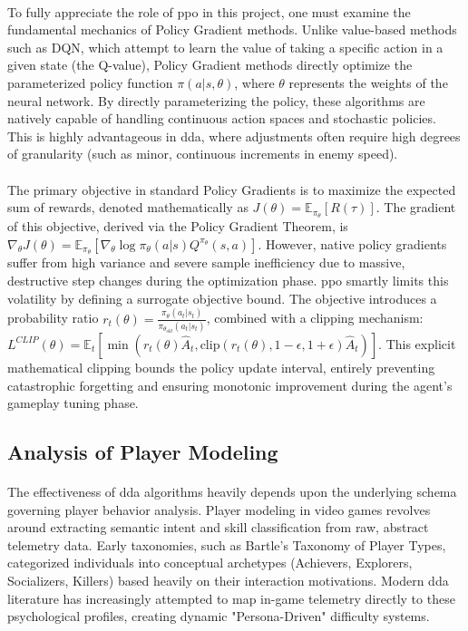 \paragraph{} To fully appreciate the role of \ac{ppo} in this project, one must examine the fundamental mechanics of Policy Gradient methods. Unlike value-based methods such as DQN, which attempt to learn the value of taking a specific action in a given state (the Q-value), Policy Gradient methods directly optimize the parameterized policy function $\pi(a|s, \theta)$, where $\theta$ represents the weights of the neural network. By directly parameterizing the policy, these algorithms are natively capable of handling continuous action spaces and stochastic policies. This is highly advantageous in \ac{dda}, where adjustments often require high degrees of granularity (such as minor, continuous increments in enemy speed).
\paragraph{} The primary objective in standard Policy Gradients is to maximize the expected sum of rewards, denoted mathematically as $J(\theta) = \mathbb{E}_{\pi_\theta} [R(\tau)]$. The gradient of this objective, derived via the Policy Gradient Theorem, is $\nabla_\theta J(\theta) = \mathbb{E}_{\pi_\theta} [\nabla_\theta \log \pi_\theta(a|s) Q^{\pi_\theta}(s,a)]$. However, native policy gradients suffer from high variance and severe sample inefficiency due to massive, destructive step changes during the optimization phase. \ac{ppo} smartly limits this volatility by defining a surrogate objective bound. The objective introduces a probability ratio $r_t(\theta) = \frac{\pi_\theta(a_t|s_t)}{\pi_{\theta_{old}}(a_t|s_t)}$, combined with a clipping mechanism: $L^{CLIP}(\theta) = \mathbb{E}_t [\min(r_t(\theta) \hat{A}_t, \text{clip}(r_t(\theta), 1-\epsilon, 1+\epsilon)\hat{A}_t)]$. This explicit mathematical clipping bounds the policy update interval, entirely preventing catastrophic forgetting and ensuring monotonic improvement during the agent's gameplay tuning phase.

\subsection{Analysis of Player Modeling}
\paragraph{} The effectiveness of \ac{dda} algorithms heavily depends upon the underlying schema governing player behavior analysis. Player modeling in video games revolves around extracting semantic intent and skill classification from raw, abstract telemetry data. Early taxonomies, such as Bartle’s Taxonomy of Player Types, categorized individuals into conceptual archetypes (Achievers, Explorers, Socializers, Killers) based heavily on their interaction motivations. Modern \ac{dda} literature has increasingly attempted to map in-game telemetry directly to these psychological profiles, creating dynamic "Persona-Driven" difficulty systems.
